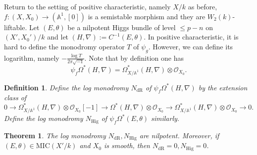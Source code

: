 \documentclass[12pt, a4paper]{article}
\newtheorem{definition}{Definition}[section]
\newtheorem{theorem}{Theorem}[section]
\begin{document}
Return to the setting of positive characteristic, namely $X/k$ as before, $f:(X,X_0)\to(\mathbb A^1,[0])$ is a semistable morphism and they are $W_2(k)$-liftable. Let $(E,\theta)$ be a nilpotent Higgs bundle of level $\leq p-n$ on $(X',X_0')/k$ and let $(H,\nabla):=C^{-1}(E,\theta)$. In positive characteristic, it is hard to define the monodromy operator $T$ of $\psi_g$. However, we can define its logarithm, namely $-\frac{\log T}{2\pi\sqrt{-1}}$. Note that by definition one has
$$
\psi_f\Omega^*(H,\nabla)=\Omega_{X/\mathbb A^1}^*(H,\nabla)\otimes\mathcal O_{X_0}.
$$
\begin{definition}\label{monodromy nearby cycle}
Define the log monodromy $N_\mathrm{dR}$ of $\psi_f\Omega^*(H,\nabla)$ by the extension class of 
$$
0\to\Omega_{X/\mathbb A^1}^*(H,\nabla)\otimes\mathcal O_{X_0}[-1]\to\Omega^*(H,\nabla)\otimes\mathcal O_{X_0}\to\Omega_{X/\mathbb A^1}^*(H,\nabla)\otimes\mathcal O_{X_0}\to0.
$$
Define the log monodromy $N_\mathrm{Hig}$ of $\psi_f\Omega^*(E,\theta)$ similarly.
\end{definition}
\begin{theorem}
The log monodromy $N_\mathrm{dR},N_\mathrm{Hig}$ are nilpotent. Moreover, if 
$(E,\theta)\in\mathrm{MIC}(X'/k)$ 
and $X_0$ is smooth, then $N_\mathrm{dR}=0,N_\mathrm{Hig}=0$.
\end{theorem}
\end{document}
